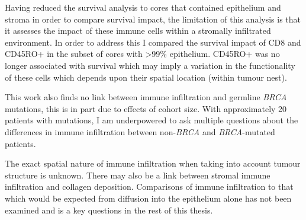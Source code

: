 Having reduced the survival analysis to cores that contained epithelium and stroma in order to compare survival impact, the limitation of this analysis is that it assesses the impact of these immune cells within a stromally infiltrated environment. In order to address this I compared the survival impact of CD8 and CD45RO+ in the subset of cores with >99\% epithelium. CD45RO+ was no longer associated with survival which may imply a variation in the functionality of these cells which depends upon their spatial location (within tumour nest).

This work also finds no link between immune infiltration and germline \textit{BRCA} mutations, this is in part due to effects of cohort size. With approximately 20 patients with mutations, I am underpowered to ask multiple questions about the differences in immune infiltration between non-\textit{BRCA} and \textit{BRCA}-mutated patients.

The exact spatial nature of immune infiltration when taking into account tumour structure is unknown. There may also be a link between stromal immune infiltration and collagen deposition. Comparisons of immune infiltration to that which would be expected from diffusion into the epithelium alone has not been examined and is a key questions in the rest of this thesis.

